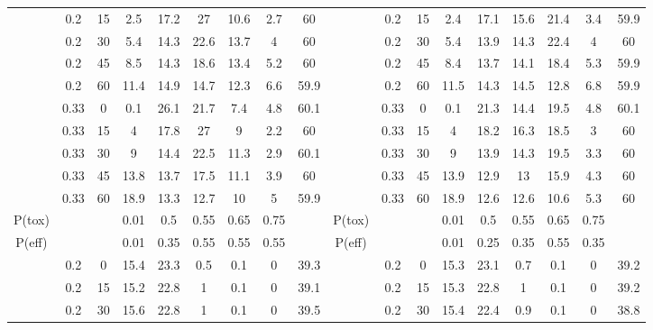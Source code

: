 \begin{table}
{\begin{tabular}[t]{cccccccc>{}c|ccccccccc}
			& 0.2 & 15 & 2.5 & 17.2 & 27 & 10.6 & 2.7 & 60 &  & 0.2 & 15 & 2.4 & 17.1 & 15.6 & 21.4 & 3.4 & 59.9\\
			
			& 0.2 & 30 & 5.4 & 14.3 & 22.6 & 13.7 & 4 & 60 &  & 0.2 & 30 & 5.4 & 13.9 & 14.3 & 22.4 & 4 & 60\\
			
			& 0.2 & 45 & 8.5 & 14.3 & 18.6 & 13.4 & 5.2 & 60 &  & 0.2 & 45 & 8.4 & 13.7 & 14.1 & 18.4 & 5.3 & 59.9\\
			
			& 0.2 & 60 & 11.4 & 14.9 & 14.7 & 12.3 & 6.6 & 59.9 &  & 0.2 & 60 & 11.5 & 14.3 & 14.5 & 12.8 & 6.8 & 59.9\\
			
			& 0.33 & 0 & 0.1 & 26.1 & 21.7 & 7.4 & 4.8 & 60.1 &  & 0.33 & 0 & 0.1 & 21.3 & 14.4 & 19.5 & 4.8 & 60.1\\
			
			& 0.33 & 15 & 4 & 17.8 & 27 & 9 & 2.2 & 60 &  & 0.33 & 15 & 4 & 18.2 & 16.3 & 18.5 & 3 & 60\\
			
			& 0.33 & 30 & 9 & 14.4 & 22.5 & 11.3 & 2.9 & 60.1 &  & 0.33 & 30 & 9 & 13.9 & 14.3 & 19.5 & 3.3 & 60\\
			
			& 0.33 & 45 & 13.8 & 13.7 & 17.5 & 11.1 & 3.9 & 60 &  & 0.33 & 45 & 13.9 & 12.9 & 13 & 15.9 & 4.3 & 60\\
			
			\multirow{-10}{*}{\centering\arraybackslash 5} & 0.33 & 60 & 18.9 & 13.3 & 12.7 & 10 & 5 & 59.9 & \multirow{-10}{*}{\centering\arraybackslash 11} & 0.33 & 60 & 18.9 & 12.6 & 12.6 & 10.6 & 5.3 & 60\\
			\cmidrule{1-18}
			P(tox) &  &  & 0.01 & 0.5 & 0.55 & 0.65 & 0.75 &  & P(tox) &  &  & 0.01 & 0.5 & 0.55 & 0.65 & 0.75 & \\
			\cmidrule{1-18}
			P(eff) &  &  & 0.01 & 0.35 & 0.55 & 0.55 & 0.55 &  & P(eff) &  &  & 0.01 & 0.25 & 0.35 & 0.55 & 0.35 & \\
			\cmidrule{1-18}
			& 0.2 & 0 & 15.4 & 23.3 & 0.5 & 0.1 & 0 & 39.3 &  & 0.2 & 0 & 15.3 & 23.1 & 0.7 & 0.1 & 0 & 39.2\\
			
			& 0.2 & 15 & 15.2 & 22.8 & 1 & 0.1 & 0 & 39.1 &  & 0.2 & 15 & 15.3 & 22.8 & 1 & 0.1 & 0 & 39.2\\
			
			& 0.2 & 30 & 15.6 & 22.8 & 1 & 0.1 & 0 & 39.5 &  & 0.2 & 30 & 15.4 & 22.4 & 0.9 & 0.1 & 0 & 38.8\\
			

\end{tabular}}
\end{table}
